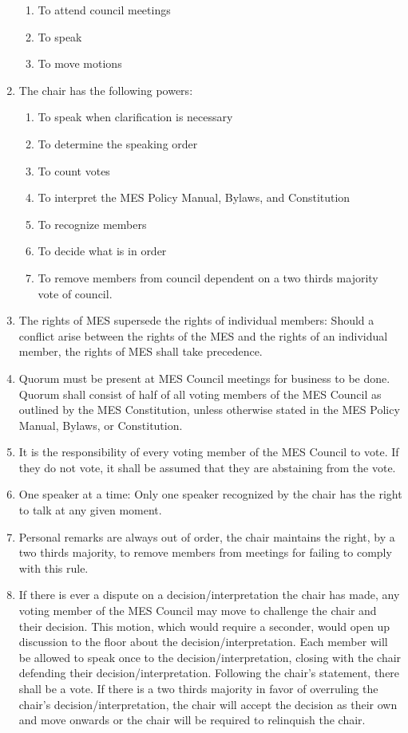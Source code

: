 \begin{enumerate}
  \begin{enumerate}
   \item
    To attend council meetings
   \item
    To speak
   \item
    To move motions
  \end{enumerate}
 \item
  The chair has the following powers:

  \begin{enumerate}
   \item
    To speak when clarification is necessary
   \item
    To determine the speaking order
   \item
    To count votes
   \item
    To interpret the MES Policy Manual, Bylaws, and Constitution
   \item
    To recognize members
   \item
    To decide what is in order
   \item
    To remove members from council dependent on a two thirds majority
    vote of council. %
  \end{enumerate}
 \item
  The rights of MES supersede the rights of individual members: Should a
  conflict arise between the rights of the MES and the rights of an
  individual member, the rights of MES shall take precedence.
 \item
  Quorum must be present at MES Council meetings for business to be
  done. Quorum shall consist of half of all voting members of the MES
  Council as outlined by the MES Constitution, unless otherwise stated
  in the MES Policy Manual, Bylaws, or Constitution.
 \item
  It is the responsibility of every voting member of the MES Council to
  vote. If they do not vote, it shall be assumed that they are
  abstaining from the vote.
 \item
  One speaker at a time: Only one speaker recognized by the chair has
  the right to talk at any given moment.
 \item
  Personal remarks are always out of order, the chair maintains the
  right, by a two thirds majority, to remove members from meetings for
  failing to comply with this rule.
 \item
  If there is ever a dispute on a decision/interpretation the chair has
  made, any voting member of the MES Council may move to challenge the
  chair and their decision. This motion, which would require a seconder,
  would open up discussion to the floor about the
  decision/interpretation. Each member will be allowed to speak once to
  the decision/interpretation, closing with the chair defending their
  decision/interpretation. Following the chair's statement, there shall
  be a vote. If there is a two thirds majority in favor of overruling
  the chair's decision/interpretation, the chair will accept the
  decision as their own and move onwards or the chair will be required
  to relinquish the chair.

\end{enumerate}

